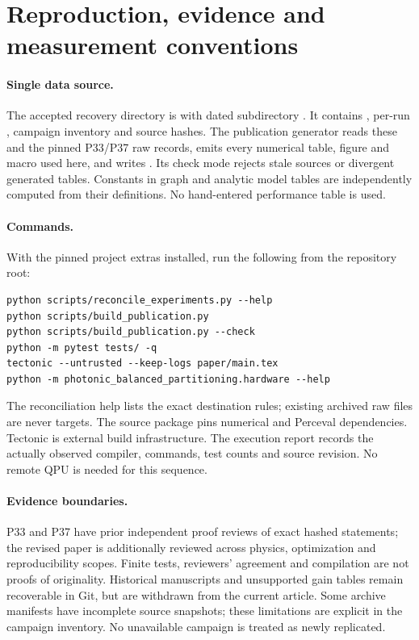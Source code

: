 \documentclass[11pt,a4paper]{article}
\theoremstyle{remark}\newtheorem{remark}[theorem]{Remark}
\begin{document}
\section{Reproduction, evidence and measurement conventions}\label{app:repro}
\paragraph{Single data source.}
The accepted recovery directory is  with dated subdirectory . It contains , per-run , campaign inventory and source hashes. The publication generator reads these and the pinned P33/P37 raw records, emits every numerical table, figure and macro used here, and writes . Its check mode rejects stale sources or divergent generated tables. Constants in graph and analytic model tables are independently computed from their definitions. No hand-entered performance table is used.

\paragraph{Commands.}
With the pinned project extras installed, run the following from the repository root:
\begin{verbatim}
python scripts/reconcile_experiments.py --help
python scripts/build_publication.py
python scripts/build_publication.py --check
python -m pytest tests/ -q
tectonic --untrusted --keep-logs paper/main.tex
python -m photonic_balanced_partitioning.hardware --help
\end{verbatim}
The reconciliation help lists the exact destination rules; existing archived raw files are never targets. The source package pins numerical and Perceval dependencies. Tectonic is external build infrastructure. The execution report records the actually observed compiler, commands, test counts and source revision. No remote QPU is needed for this sequence.

\paragraph{Evidence boundaries.}
P33 and P37 have prior independent proof reviews of exact hashed statements; the revised paper is additionally reviewed across physics, optimization and reproducibility scopes. Finite tests, reviewers' agreement and compilation are not proofs of originality. Historical manuscripts and unsupported gain tables remain recoverable in Git, but are withdrawn from the current article. Some archive manifests have incomplete source snapshots; these limitations are explicit in the campaign inventory. No unavailable campaign is treated as newly replicated.
\end{document}
